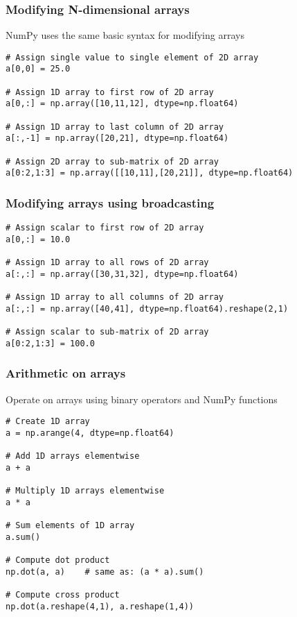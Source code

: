 \documentclass[10pt]{beamer}
\begin{document}
\begin{frame}[fragile]
\frametitle{Modifying N-dimensional arrays}
NumPy uses the same basic syntax for modifying arrays
\begin{verbatim}
# Assign single value to single element of 2D array
a[0,0] = 25.0

# Assign 1D array to first row of 2D array
a[0,:] = np.array([10,11,12], dtype=np.float64)

# Assign 1D array to last column of 2D array
a[:,-1] = np.array([20,21], dtype=np.float64)

# Assign 2D array to sub-matrix of 2D array
a[0:2,1:3] = np.array([[10,11],[20,21]], dtype=np.float64)
\end{verbatim}
\end{frame}

\begin{frame}[fragile]
\frametitle{Modifying arrays using broadcasting}
\begin{verbatim}
# Assign scalar to first row of 2D array
a[0,:] = 10.0

# Assign 1D array to all rows of 2D array
a[:,:] = np.array([30,31,32], dtype=np.float64)

# Assign 1D array to all columns of 2D array
a[:,:] = np.array([40,41], dtype=np.float64).reshape(2,1)

# Assign scalar to sub-matrix of 2D array
a[0:2,1:3] = 100.0
\end{verbatim}
\end{frame}

\begin{frame}[fragile]
\frametitle{Arithmetic on arrays}
Operate on arrays using binary operators and NumPy functions
\begin{verbatim}
# Create 1D array
a = np.arange(4, dtype=np.float64)

# Add 1D arrays elementwise
a + a

# Multiply 1D arrays elementwise
a * a

# Sum elements of 1D array
a.sum()

# Compute dot product
np.dot(a, a)    # same as: (a * a).sum()

# Compute cross product
np.dot(a.reshape(4,1), a.reshape(1,4))
\end{verbatim}
\end{frame}
\end{document}

